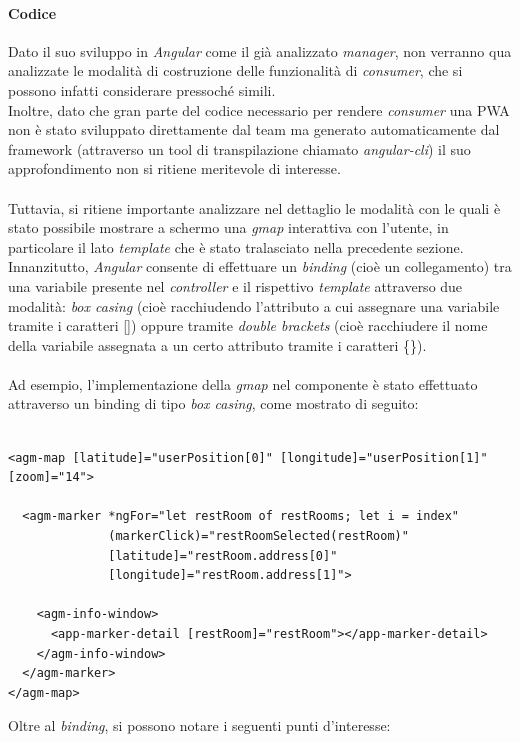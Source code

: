 \documentclass[12pt]{article}
\begin{document}
\paragraph{Codice}
Dato il suo sviluppo in \textit{Angular} come il già analizzato \textit{manager}, non verranno qua analizzate le modalità di costruzione delle funzionalità di \textit{consumer}, che si possono infatti considerare pressoché simili.\\
Inoltre, dato che gran parte del codice necessario per rendere \textit{consumer} una PWA non è stato sviluppato direttamente dal team ma generato automaticamente dal framework (attraverso un tool di transpilazione chiamato \textit{angular-cli}) il suo approfondimento non si ritiene meritevole di interesse.\\\\
Tuttavia, si ritiene importante analizzare nel dettaglio le modalità con le quali è stato possibile mostrare a schermo una \textit{gmap} interattiva con l'utente, in particolare il lato \textit{template} che è stato tralasciato nella precedente sezione.\\
Innanzitutto, \textit{Angular} consente di effettuare un \textit{binding} (cioè un collegamento) tra una variabile presente nel \textit{controller} e il rispettivo \textit{template} attraverso due modalità: \textit{box casing} (cioè racchiudendo l'attributo a cui assegnare una variabile tramite i caratteri []) oppure tramite \textit{double brackets} (cioè racchiudere il nome della variabile assegnata a un certo attributo tramite i caratteri \{\}).\\\\
Ad esempio, l'implementazione della \textit{gmap} nel componente è stato effettuato attraverso un binding di tipo \textit{box casing}, come mostrato di seguito: 
\begin{lstlisting}[style=htmlcssjs]

<agm-map [latitude]="userPosition[0]" [longitude]="userPosition[1]"
[zoom]="14">

  <agm-marker *ngFor="let restRoom of restRooms; let i = index"
              (markerClick)="restRoomSelected(restRoom)"
              [latitude]="restRoom.address[0]"
              [longitude]="restRoom.address[1]">

    <agm-info-window>
      <app-marker-detail [restRoom]="restRoom"></app-marker-detail>
    </agm-info-window>
  </agm-marker>
</agm-map>
\end{lstlisting}
\newpage
Oltre al \textit{binding}, si possono notare i seguenti punti d'interesse:
\end{document}
